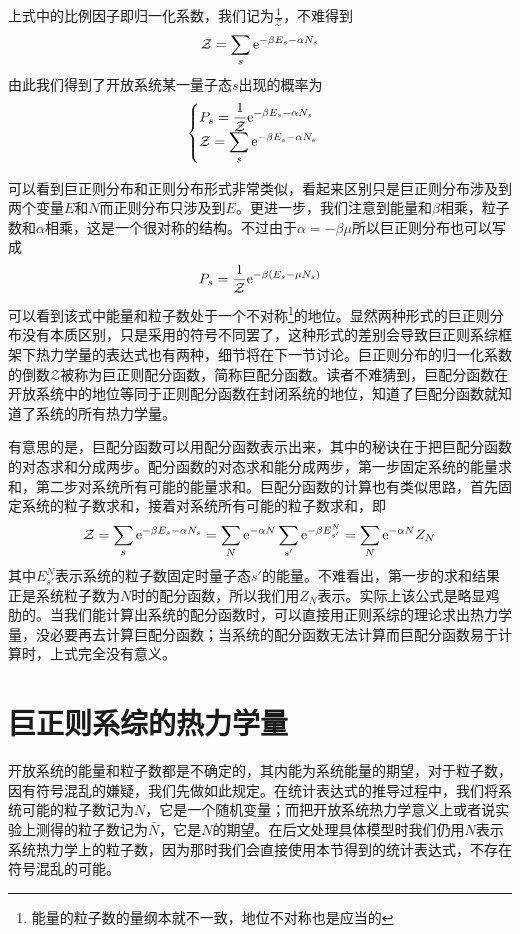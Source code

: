 \documentclass[../../main.tex]{subfiles}
\begin{document}
上式中的比例因子即归一化系数，我们记为\(\frac{1}{\mathcal{Z}}\)，不难得到
\begin{equation}
    \mathcal{Z}=\sum_s \mathrm{e}^{-\beta E_s-\alpha N_s}
\end{equation}
由此我们得到了开放系统某一量子态\(s\)出现的概率为
\begin{equation}
    \begin{cases}
        \displaystyle P_s=\frac{1}{\mathcal{Z}}\mathrm{e}^{-\beta E_s-\alpha N_s} \\
        \displaystyle \mathcal{Z}=\sum_s \mathrm{e}^{-\beta E_s-\alpha N_s}
    \end{cases}
\end{equation}

可以看到巨正则分布和正则分布形式非常类似，看起来区别只是巨正则分布涉及到两个变量\(E\)和\(N\)而正则分布只涉及到\(E\)。更进一步，我们注意到能量和\(\beta\)相乘，粒子数和\(\alpha\)相乘，这是一个很对称的结构。不过由于\(\alpha=-\beta\mu\)所以巨正则分布也可以写成
\begin{equation}
    P_s=\frac{1}{\mathcal{Z}}\mathrm{e}^{-\beta (E_s-\mu N_s)}
\end{equation}
可以看到该式中能量和粒子数处于一个不对称\footnote{能量的粒子数的量纲本就不一致，地位不对称也是应当的}的地位。显然两种形式的巨正则分布没有本质区别，只是采用的符号不同罢了，这种形式的差别会导致巨正则系综框架下热力学量的表达式也有两种，细节将在下一节讨论。巨正则分布的归一化系数的倒数\(\mathcal{Z}\)被称为巨正则配分函数，简称巨配分函数。读者不难猜到，巨配分函数在开放系统中的地位等同于正则配分函数在封闭系统的地位，知道了巨配分函数就知道了系统的所有热力学量。

有意思的是，巨配分函数可以用配分函数表示出来，其中的秘诀在于把巨配分函数的对态求和分成两步。配分函数的对态求和能分成两步，第一步固定系统的能量求和，第二步对系统所有可能的能量求和。巨配分函数的计算也有类似思路，首先固定系统的粒子数求和，接着对系统所有可能的粒子数求和，即
\begin{equation}
    \mathcal{Z}=\sum_s \mathrm{e}^{-\beta E_s-\alpha N_s}=\sum_{N}\mathrm{e}^{-\alpha N}\sum_{s'}\mathrm{e}^{-\beta E_{s'}^{N}}=\sum_N \mathrm{e}^{-\alpha N}Z_N
\end{equation}
其中\(E_{s'}^{N}\)表示系统的粒子数固定时量子态\(s'\)的能量。不难看出，第一步的求和结果正是系统粒子数为\(N\)时的配分函数，所以我们用\(Z_N\)表示。实际上该公式是略显鸡肋的。当我们能计算出系统的配分函数时，可以直接用正则系综的理论求出热力学量，没必要再去计算巨配分函数；当系统的配分函数无法计算而巨配分函数易于计算时，上式完全没有意义。
\section{巨正则系综的热力学量}
开放系统的能量和粒子数都是不确定的，其内能为系统能量的期望，对于粒子数，因有符号混乱的嫌疑，我们先做如此规定。在统计表达式的推导过程中，我们将系统可能的粒子数记为\(N\)，它是一个随机变量；而把开放系统热力学意义上或者说实验上测得的粒子数记为\(\bar{N}\)，它是\(N\)的期望。在后文处理具体模型时我们仍用\(N\)表示系统热力学上的粒子数，因为那时我们会直接使用本节得到的统计表达式，不存在符号混乱的可能。
\end{document}

